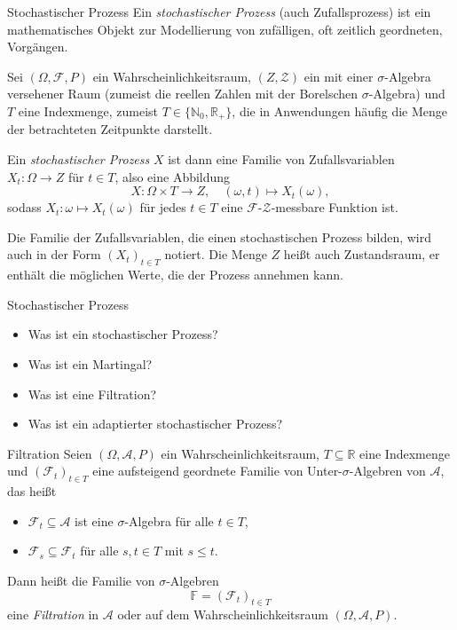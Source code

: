 \begin{defi}{Stochastischer Prozess}
    Ein \emph{stochastischer Prozess} (auch Zufallsprozess) ist ein mathematisches Objekt zur Modellierung von zufälligen, oft zeitlich geordneten, Vorgängen.

    Sei $(\Omega, \mathcal{F}, P)$ ein Wahrscheinlichkeitsraum, $(Z, \mathcal{Z})$ ein mit einer $\sigma$-Algebra versehener Raum (zumeist die reellen Zahlen mit der Borelschen $\sigma$-Algebra) und $T$ eine Indexmenge, zumeist $T \in \{\mathbb{N}_0, \mathbb{R}_+\}$, die in Anwendungen häufig die Menge der betrachteten Zeitpunkte darstellt.

    Ein \emph{stochastischer Prozess} $X$ ist dann eine Familie von Zufallsvariablen $X_t: \Omega \to Z$ für $t \in T$, also eine Abbildung
    \[
        X: \Omega \times T \to Z, \quad (\omega, t) \mapsto X_t(\omega),
    \]
    sodass $X_t: \omega \mapsto X_t(\omega)$ für jedes $t \in T$ eine $\mathcal{F}$-$\mathcal{Z}$-messbare Funktion ist.

    Die Familie der Zufallsvariablen, die einen stochastischen Prozess bilden, wird auch in der Form $(X_t)_{t \in T}$ notiert.
    Die Menge $Z$ heißt auch Zustandsraum, er enthält die möglichen Werte, die der Prozess annehmen kann.
\end{defi}

\begin{info}{Stochastischer Prozess}
    \begin{itemize}
        \item Was ist ein stochastischer Prozess?
        \item Was ist ein Martingal?
        \item Was ist eine Filtration?
        \item Was ist ein adaptierter stochastischer Prozess?
    \end{itemize}
\end{info}

\begin{defi}{Filtration}
    Seien $(\Omega ,{\mathcal{A}},P)$ ein Wahrscheinlichkeitsraum, $T \subseteq \mathbb{R}$ eine Indexmenge und $({\mathcal{F}}_{t})_{t\in T}$ eine aufsteigend geordnete Familie von Unter-$\sigma$-Algebren von $\mathcal{A}$, das heißt
    \begin{itemize}
        \item ${\mathcal{F}}_{t} \subseteq \mathcal{A}$ ist eine $\sigma$-Algebra für alle $t \in T$,
        \item ${\mathcal{F}}_{s} \subseteq{\mathcal{F}}_{t}$ für alle $s, t \in T$ mit $s \leq t$.
    \end{itemize}

    Dann heißt die Familie von $\sigma$-Algebren
    \[
        \mathbb{F} = ({\mathcal{F}}_{t})_{t\in T}
    \]
    eine \emph{Filtration} in $\mathcal{A}$ oder auf dem Wahrscheinlichkeitsraum $(\Omega ,{\mathcal{A}},P)$.
\end{defi}

